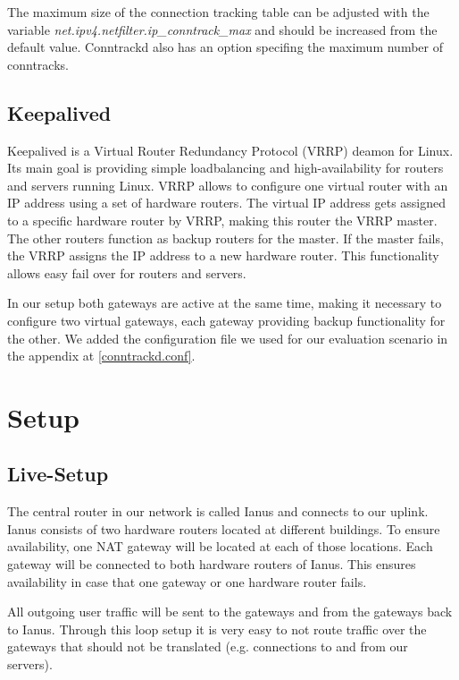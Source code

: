 \documentclass{report}
\begin{document}
The maximum size of the connection tracking table can be adjusted with
the variable \linebreak \textit{net.ipv4.netfilter.ip\_conntrack\_max} and should be
increased from the default value. Conntrackd also has an option specifing
the maximum number of conntracks.

\section{Keepalived}\label{keepalived}

Keepalived\cite{keepalived} is a Virtual Router Redundancy Protocol (VRRP)\cite{vrrp} deamon
for Linux. Its main goal is providing simple loadbalancing and
high-availability for routers and servers running Linux. VRRP allows to
configure one virtual router with an IP address using a set of hardware
routers. The virtual IP address gets assigned to a specific hardware router by
VRRP, making this router the VRRP master. The other routers
function as backup routers for the master. If the master fails, the VRRP
assigns the IP address to a new hardware router. This functionality allows easy
fail over for routers and servers.

In our setup both gateways are active at the same time, making it
necessary to configure two virtual gateways, each gateway
providing backup functionality for the other. We added the configuration file
we used for our evaluation scenario in the appendix at \ref{conntrackd.conf}.


\chapter{Setup}\label{setup}

\section{Live-Setup}\label{live-setup}

The central router in our network is called Ianus and connects to
our uplink. Ianus consists of two hardware routers located at different
buildings. To ensure availability, one NAT gateway will be located at
each of those locations. Each gateway will be connected to both hardware
routers of Ianus. This ensures availability in case that one gateway or
one hardware router fails.

All outgoing user traffic will be sent to the gateways and from the
gateways back to Ianus. Through this loop setup it is very easy to not
route traffic over the gateways that should not be translated (e.g.
connections to and from our servers).
\end{document}
